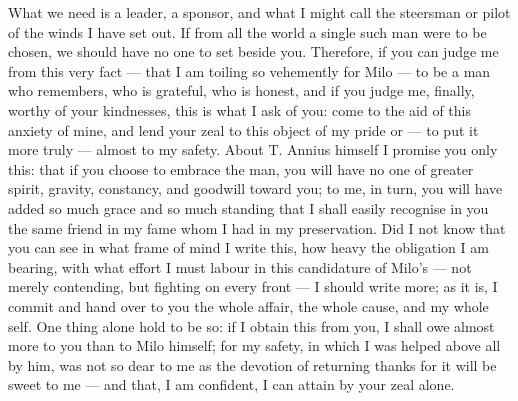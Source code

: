  What we need is a leader, a sponsor, and what I might call the steersman or pilot of the winds I have set out. If from all the world a single such man were to be chosen, we should have no one to set beside you. Therefore, if you can judge me from this very fact --- that I am toiling so vehemently for Milo --- to be a man who remembers, who is grateful, who is honest, and if you judge me, finally, worthy of your kindnesses, this is what I ask of you: come to the aid of this anxiety of mine, and lend your zeal to this object of my pride or --- to put it more truly --- almost to my safety. About T. Annius himself I promise you only this: that if you choose to embrace the man, you will have no one of greater spirit, gravity, constancy, and goodwill toward you; to me, in turn, you will have added so much grace and so much standing that I shall easily recognise in you the same friend in my fame whom I had in my preservation. Did I not know that you can see in what frame of mind I write this, how heavy the obligation I am bearing, with what effort I must labour in this candidature of Milo's --- not merely contending, but fighting on every front --- I should write more; as it is, I commit and hand over to you the whole affair, the whole cause, and my whole self. One thing alone hold to be so: if I obtain this from you, I shall owe almost more to you than to Milo himself; for my safety, in which I was helped above all by him, was not so dear to me as the devotion of returning thanks for it will be sweet to me --- and that, I am confident, I can attain by your zeal alone.
